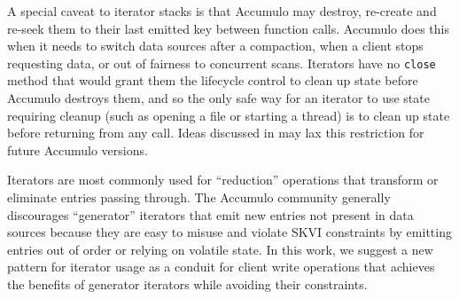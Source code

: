 A special caveat to iterator stacks is that Accumulo may destroy, re-create 
and re-seek them to their last emitted key between function calls.
Accumulo does this when it needs to switch data sources after a compaction, 
when a client stops requesting data, or out of fairness to concurrent scans.
Iterators have no \texttt{close} method that would grant them the lifecycle control to clean up state
before Accumulo destroys them, and so the only safe way for an 
iterator to use state requiring cleanup (such as opening a file or starting a thread)
is to clean up state before returning from any call.
Ideas discussed in \cite{ACCUMULO-3751} may lax this restriction for future Accumulo versions.


Iterators are most commonly used for ``reduction'' operations that transform
or eliminate entries passing through.  The Accumulo community generally discourages ``generator'' iterators 
that emit new entries not present in data sources %
because they are easy to misuse and violate SKVI constraints by emitting entries out of order or 
relying on volatile state.
In this work, we suggest a new pattern for iterator usage as a conduit for client write operations 
that achieves the benefits of generator iterators while avoiding their constraints.

